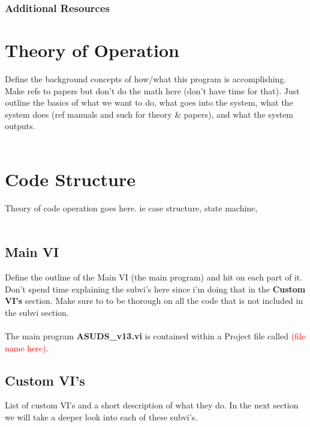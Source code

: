 \documentclass[letterpaper, twoside, openright]{report}
\begin{document}
\subsection{Additional Resources}

\cite{gomez_alvarez-arenas_air-coupled_2003}

\chapter{Theory of Operation}

Define the background concepts of how/what this program is accomplishing.  Make refs to papers but don't do the math here (don't have time for that).  Just outline the basics of what we want to do, what goes into the system, what the system does (ref manuals and such for theory \& papers), and what the system outputs.
\\ \\

\chapter{Code Structure}

Theory of code operation goes here. ie case structure, state machine, 
\\ \\
\section{Main VI}

Define the outline of the Main VI (the main program) and hit on each part of it.  Don't spend time explaining the subvi's here since i'm doing that in the \textbf{Custom VI's} section. Make sure to to be thorough on all the code that is not included in the subvi section.
\\ \\
The main program \textbf{ASUDS\_v13.vi} is contained within a Project file called \textcolor{red}{(file name here)}.

\section{Custom VI's}

List of custom VI's and a short description of what they do. In the next section we will take a deeper look into each of these subvi's.
\end{document}
